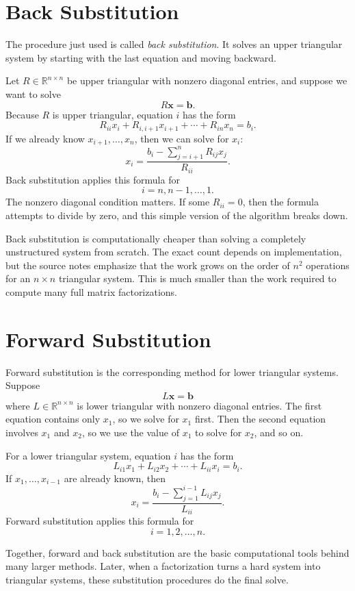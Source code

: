 \section{Back Substitution}
\label{mf:back-substitution}

The procedure just used is called \emph{back substitution}. It solves an upper triangular system by starting with the last equation and moving backward.

Let \(R\in\mathbb{R}^{n\times n}\) be upper triangular with nonzero diagonal entries, and suppose we want to solve
\[
    R\mathbf{x}=\mathbf{b}.
\]
Because \(R\) is upper triangular, equation \(i\) has the form
\[
    R_{ii}x_i+R_{i,i+1}x_{i+1}+\cdots+R_{in}x_n=b_i.
\]
If we already know \(x_{i+1},\ldots,x_n\), then we can solve for \(x_i\):
\[
    x_i=
    \frac{b_i-\sum_{j=i+1}^n R_{ij}x_j}{R_{ii}}.
\]
Back substitution applies this formula for
\[
    i=n,n-1,\ldots,1.
\]
The nonzero diagonal condition matters. If some \(R_{ii}=0\), then the formula attempts to divide by zero, and this simple version of the algorithm breaks down.

Back substitution is computationally cheaper than solving a completely unstructured system from scratch. The exact count depends on implementation, but the source notes emphasize that the work grows on the order of \(n^2\) operations for an \(n\times n\) triangular system. This is much smaller than the work required to compute many full matrix factorizations.

\section{Forward Substitution}
\label{mf:forward-substitution}

Forward substitution is the corresponding method for lower triangular systems. Suppose
\[
    L\mathbf{x}=\mathbf{b}
\]
where \(L\in\mathbb{R}^{n\times n}\) is lower triangular with nonzero diagonal entries. The first equation contains only \(x_1\), so we solve for \(x_1\) first. Then the second equation involves \(x_1\) and \(x_2\), so we use the value of \(x_1\) to solve for \(x_2\), and so on.

For a lower triangular system, equation \(i\) has the form
\[
    L_{i1}x_1+L_{i2}x_2+\cdots+L_{ii}x_i=b_i.
\]
If \(x_1,\ldots,x_{i-1}\) are already known, then
\[
    x_i=
    \frac{b_i-\sum_{j=1}^{i-1}L_{ij}x_j}{L_{ii}}.
\]
Forward substitution applies this formula for
\[
    i=1,2,\ldots,n.
\]

Together, forward and back substitution are the basic computational tools behind many larger methods. Later, when a factorization turns a hard system into triangular systems, these substitution procedures do the final solve.


